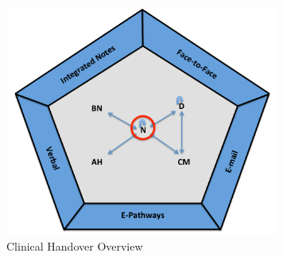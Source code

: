 \newpage
\begin{figure}[hp]
				\centering
				\includegraphics[scale=1.0, width=90mm]{Images/Clinical_Handover_Overview}
				\caption{Clinical Handover Overview}
				\label{Clinical Handover Overview}
\end{figure} 

